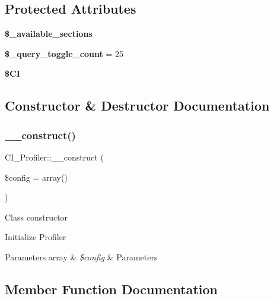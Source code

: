 \subsection*{Protected Attributes}
\begin{DoxyCompactItemize}
\item 
{\bfseries \$\+\_\+available\+\_\+sections}
\item 
\mbox{\label{class_c_i___profiler_a20df25c5b24e093794cd26fcc8fab8af}} 
{\bfseries \$\+\_\+query\+\_\+toggle\+\_\+count} = 25
\item 
\mbox{\label{class_c_i___profiler_a9731fd08f10058d88d09cac5de5ca22f}} 
{\bfseries \$\+CI}
\end{DoxyCompactItemize}


\subsection{Constructor \& Destructor Documentation}
\mbox{\label{class_c_i___profiler_ae0ad0e7bdef4430becc2fdbac1a4951e}} 
\subsubsection{\texorpdfstring{\+\_\+\+\_\+construct()}{\_\_construct()}}
{\footnotesize\ttfamily C\+I\+\_\+\+Profiler\+::\+\_\+\+\_\+construct (\begin{DoxyParamCaption}\item[{}]{\$config = {\ttfamily array()} }\end{DoxyParamCaption})}

Class constructor

Initialize Profiler


\begin{DoxyParams}[1]{Parameters}
array & {\em \$config} & Parameters \\
\hline
\end{DoxyParams}


\subsection{Member Function Documentation}
\mbox{\label{class_c_i___profiler_a43f5ecdbab2eb8a10a75fdf80b98f471}} 
